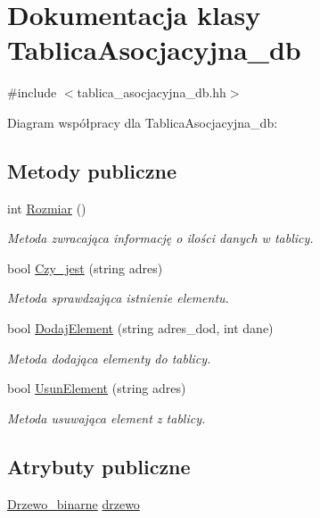 \hypertarget{class_tablica_asocjacyjna__db}{\section{\-Dokumentacja klasy \-Tablica\-Asocjacyjna\-\_\-db}
\label{class_tablica_asocjacyjna__db}
}


{\ttfamily \#include $<$tablica\-\_\-asocjacyjna\-\_\-db.\-hh$>$}



\-Diagram współpracy dla \-Tablica\-Asocjacyjna\-\_\-db\-:
\subsection*{\-Metody publiczne}
\begin{DoxyCompactItemize}
\item 
int \hyperlink{class_tablica_asocjacyjna__db_adbb610341c19c92e7f31d93020407f78}{\-Rozmiar} ()
\begin{DoxyCompactList}\small\item\em \-Metoda zwracająca informację o ilości danych w tablicy. \end{DoxyCompactList}\item 
bool \hyperlink{class_tablica_asocjacyjna__db_abdb71c0bef53904ba3538cfafeb1f8a0}{\-Czy\-\_\-jest} (string adres)
\begin{DoxyCompactList}\small\item\em \-Metoda sprawdzająca istnienie elementu. \end{DoxyCompactList}\item 
bool \hyperlink{class_tablica_asocjacyjna__db_a7d3ecb28ec20bde2f72e94e104c40779}{\-Dodaj\-Element} (string adres\-\_\-dod, int dane)
\begin{DoxyCompactList}\small\item\em \-Metoda dodająca elementy do tablicy. \end{DoxyCompactList}\item 
bool \hyperlink{class_tablica_asocjacyjna__db_a7546f49a47117ad38adcf063f4fed305}{\-Usun\-Element} (string adres)
\begin{DoxyCompactList}\small\item\em \-Metoda usuwająca element z tablicy. \end{DoxyCompactList}\end{DoxyCompactItemize}
\subsection*{\-Atrybuty publiczne}
\begin{DoxyCompactItemize}
\item 
\hyperlink{class_drzewo__binarne}{\-Drzewo\-\_\-binarne} \hyperlink{class_tablica_asocjacyjna__db_acbff6baa867f8ccd15b2106e0f557c95}{drzewo}
\end{DoxyCompactItemize}



